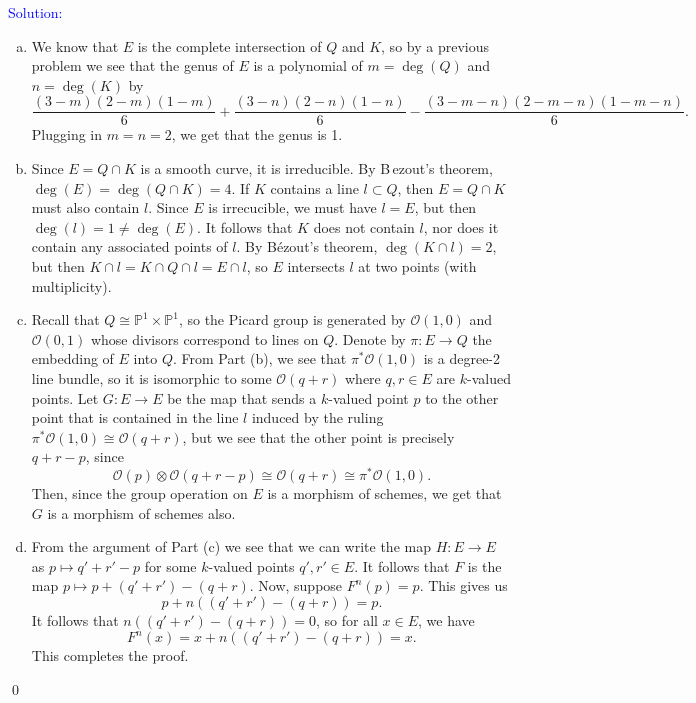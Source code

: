 \documentclass[11pt]{article}
\newcommand{\PP}{\mathbb{P}}
\newcommand{\cO}{\mathcal{O}}
\newenvironment{solution}{\begin{trivlist}\item[]{\textcolor{blue}{Solution:}}}{\qed \end{trivlist}}
\begin{document}
\begin{solution}
\begin{enumerate}[(a)]
	\item We know that $E$ is the complete intersection of $Q$ and $K$, so by a previous problem we see that the genus of $E$ is a polynomial of $m = \deg (Q)$ and $n = \deg (K)$ by 
	\[
		\frac{(3 - m)(2 - m)(1 - m)}{6} + \frac{(3 - n)(2 - n)(1 - n)}{6} - \frac{(3 - m - n)(2 - m - n)(1 - m - n)}{6}.
	\]
	Plugging in $m = n = 2$, we get that the genus is 1.

	\item Since $E = Q \cap K$ is a smooth curve, it is irreducible. By B\,ezout's theorem, $\deg (E) = \deg(Q \cap K) = 4$. If $K$ contains a line $l \subset Q$, then $E = Q \cap K$ must also contain $l$. Since $E$ is irrecucible, we must have $l = E$, but then $\deg(l) = 1 \neq \deg(E)$. It follows that $K$ does not contain $l$, nor does it contain any associated points of $l$. By B\'ezout's theorem, $\deg (K \cap l) = 2$, but then $K \cap l = K \cap Q \cap l = E \cap l$, so $E$ intersects $l$ at two points (with multiplicity). 
	
	\item Recall that $Q \cong \PP^1 \times \PP^1$, so the Picard group is generated by $\cO(1, 0)$ and $\cO(0, 1)$ whose divisors correspond to lines on $Q$. Denote by $\pi: E \rightarrow Q$ the embedding of $E$ into $Q$. From Part (b), we see that $\pi^* \cO(1, 0)$ is a degree-2 line bundle, so it is isomorphic to some $\cO(q + r)$ where $q, r \in E$ are $k$-valued points. 
	Let $G: E \rightarrow E$ be the map that sends a $k$-valued point $p$ to the other point that is contained in the line $l$ induced by the ruling $\pi^*\cO(1, 0) \cong \cO(q + r)$, but we see that the other point is precisely $q + r - p$, since 
	\[
		\cO(p) \otimes \cO(q+r-p) \cong \cO(q+r) \cong \pi^* \cO(1, 0).
	\] 
	Then, since the group operation on $E$ is a morphism of schemes, we get that $G$ is a morphism of schemes also. 

	\item From the argument of Part (c) we see that we can write the map $H: E \rightarrow E$ as $p \mapsto q' + r' - p$ for some $k$-valued points $q', r' \in E$. It follows that $F$ is the map $p \mapsto p + (q' + r') - (q + r)$. Now, suppose $F^n(p) = p$. This gives us 
	\[
		p + n ((q' + r') - (q + r)) = p.
	\]
	It follows that $n((q' + r') - (q + r)) = 0$, so for all $x \in E$, we have 
	\[
		F^n(x) = x + n((q' + r') - (q + r)) = x.
	\]
	This completes the proof. 
\end{enumerate}
\end{solution}
\end{document}
